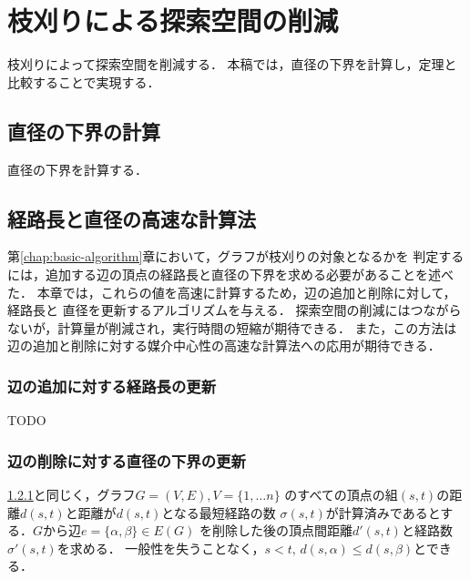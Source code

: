 
\chapter{枝刈りによる探索空間の削減}
\label{chap:reduce-by-prune}
枝刈りによって探索空間を削減する．
本稿では，直径の下界を計算し，定理と比較することで実現する．

\section{直径の下界の計算}
\label{sect:distance-lower-bound}
直径の下界を計算する．

\section{経路長と直径の高速な計算法}
\label{sect:faster-min-max}
第\ref{chap:basic-algorithm}章において，グラフが枝刈りの対象となるかを
判定するには，追加する辺の頂点の経路長と直径の下界を求める必要があることを述べた．
本章では，これらの値を高速に計算するため，辺の追加と削除に対して，経路長と
直径を更新するアルゴリズムを与える．
探索空間の削減にはつながらないが，計算量が削減され，実行時間の短縮が期待できる．
また，この方法は辺の追加と削除に対する媒介中心性の高速な計算法への応用が期待できる．

\subsection{辺の追加に対する経路長の更新}
\label{subsect:update-path-length}
TODO

\subsection{辺の削除に対する直径の下界の更新}
\label{subsect:update-lower-bound-of-diameter}
\ref{subsect:update-path-length}と同じく，グラフ$G=(V,E),V=\{1,\ldots n\}$
のすべての頂点の組$(s,t)$の距離$d(s,t)$と距離が$d(s,t)$となる最短経路の数
$\sigma(s,t)$が計算済みであるとする．$G$から辺$e=\{\alpha,\beta\}\in E(G)$
を削除した後の頂点間距離$d'(s,t)$と経路数$\sigma'(s,t)$を求める．
一般性を失うことなく，$s<t,\,d(s,\alpha)\leq d(s,\beta)$とできる．

